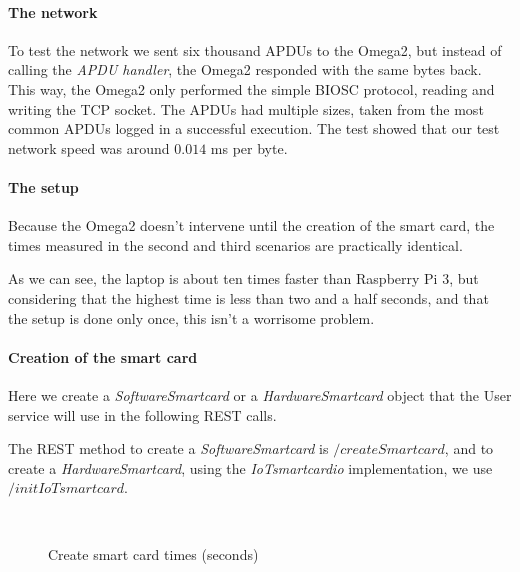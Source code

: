 \paragraph{The network}
To test the network we sent six thousand APDUs to the Omega2, but instead of calling the \textit{APDU handler}, the Omega2 responded with the same bytes back. This way, the Omega2 only performed the simple BIOSC protocol, reading and writing the TCP socket.
The APDUs had multiple sizes, taken from the most common APDUs logged in a successful execution. The test showed that our test network speed was around $0.014$ ms per byte.


\paragraph{The setup}
Because the Omega2 doesn't intervene until the creation of the smart card, the times measured in the second and third scenarios are practically identical.


As we can see, the laptop is about ten times faster than Raspberry Pi 3, but considering that the highest time is less than two and a half seconds, and that the setup is done only once, this isn't a worrisome problem.

\paragraph{Creation of the smart card}
Here we create a \textit{SoftwareSmartcard} or a \textit{HardwareSmartcard} object that the User service will use in the following REST calls.

The REST method to create a \textit{SoftwareSmartcard} is $/createSmartcard$, and to create a \textit{HardwareSmartcard}, using the \textit{IoTsmartcardio} implementation, we use $/initIoTsmartcard$.


\begin{figure}[bth]
	\myfloatalign
	 \quad
	 \\
	\caption{Create smart card times (seconds)}
	\label{fig:createSmartCard:graph}
\end{figure}

